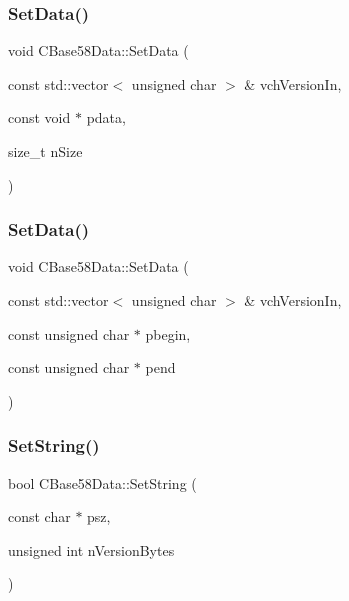 \subsubsection{\texorpdfstring{Set\+Data()}{SetData()}\hspace{0.1cm}{\footnotesize\ttfamily [1/2]}}
{\footnotesize\ttfamily void C\+Base58\+Data\+::\+Set\+Data (\begin{DoxyParamCaption}\item[{const std\+::vector$<$ unsigned char $>$ \&}]{vch\+Version\+In,  }\item[{const void $\ast$}]{pdata,  }\item[{size\+\_\+t}]{n\+Size }\end{DoxyParamCaption})\hspace{0.3cm}{\ttfamily [protected]}}

\mbox{\label{class_c_base58_data_a8314b00685e590b4005be5cdfd36aeb9}} 
\subsubsection{\texorpdfstring{Set\+Data()}{SetData()}\hspace{0.1cm}{\footnotesize\ttfamily [2/2]}}
{\footnotesize\ttfamily void C\+Base58\+Data\+::\+Set\+Data (\begin{DoxyParamCaption}\item[{const std\+::vector$<$ unsigned char $>$ \&}]{vch\+Version\+In,  }\item[{const unsigned char $\ast$}]{pbegin,  }\item[{const unsigned char $\ast$}]{pend }\end{DoxyParamCaption})\hspace{0.3cm}{\ttfamily [protected]}}

\mbox{\label{class_c_base58_data_ae4aa0c0eca8c691ab9516a1596cb9a0a}} 
\subsubsection{\texorpdfstring{Set\+String()}{SetString()}\hspace{0.1cm}{\footnotesize\ttfamily [1/2]}}
{\footnotesize\ttfamily bool C\+Base58\+Data\+::\+Set\+String (\begin{DoxyParamCaption}\item[{const char $\ast$}]{psz,  }\item[{unsigned int}]{n\+Version\+Bytes }\end{DoxyParamCaption})}

